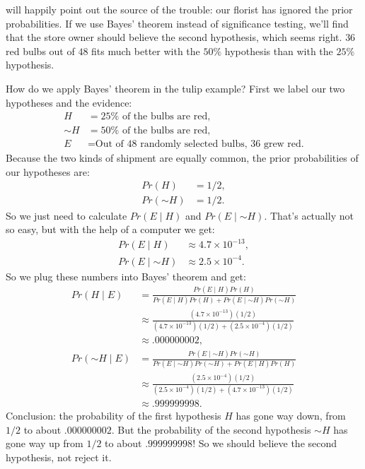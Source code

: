 \documentclass[justified]{tufte-book}
\newcommand{\given}{\mid}
\renewcommand{\neg}{\mathbin{\sim}}
\newcommand{\p}{Pr}
\theoremstyle{definition}
\theoremstyle{definition}
\theoremstyle{definition}
\theoremstyle{remark}
\begin{document}
 will happily point out the source of the trouble: our florist has ignored the prior probabilities. If we use Bayes' theorem instead of significance testing, we'll find that the store owner should believe the second hypothesis, which seems right. \(36\) red bulbs out of \(48\) fits much better with the \(50\%\) hypothesis than with the \(25\%\) hypothesis.

How do we apply Bayes' theorem in the tulip example? First we label our two hypotheses and the evidence:
\[
  \begin{aligned}
    H      &= \mbox{$25\%$ of the bulbs are red},\\
    \neg H &= \mbox{$50\%$ of the bulbs are red,}\\
    E      &= \mbox{Out of 48 randomly selected bulbs, 36 grew red.}
  \end{aligned}
\]
Because the two kinds of shipment are equally common, the prior probabilities of our hypotheses are:
\[
  \begin{aligned}
    \p(H) &= 1/2,\\
    \p(\neg H) &= 1/2.
  \end{aligned}
\]
So we just need to calculate \(\p(E \given H)\) and \(\p(E \given \neg H)\). That's actually not so easy, but with the help of a computer we get:
\[
  \begin{aligned}
    \p(E \given H) &\approx 4.7 \times 10^{-13},\\
    \p(E \given \neg H) &\approx 2.5 \times 10^{-4}.
  \end{aligned}
\]
So we plug these numbers into Bayes' theorem and get:
\[
  \begin{aligned}
    \p(H \given E) &= \frac{\p(E \given H)\p(H)}{\p(E \given H)\p(H) + \p(E \given \neg H)\p(\neg H)}\\
        &\approx \frac{(4.7 \times 10^{-13})(1/2)}{(4.7 \times 10^{-13})(1/2) + (2.5 \times 10^{-4})(1/2)}\\
        &\approx .000000002,\\
    \p(\neg H \given E) &= \frac{\p(E \given \neg H)\p(\neg H)}{\p(E \given \neg H)\p(\neg H) + \p(E \given H)\p(H)}\\
        &\approx \frac{(2.5 \times 10^{-4})(1/2)}{(2.5 \times 10^{-4})(1/2) + (4.7 \times 10^{-13})(1/2)}\\
        &\approx .999999998.
  \end{aligned}
\]
Conclusion: the probability of the first hypothesis \(H\) has gone way down, from \(1/2\) to about \(.000000002\). But the probability of the second hypothesis \(\neg H\) has gone way up from \(1/2\) to about \(.999999998\)! So we should believe the second hypothesis, not reject it.
\end{document}
